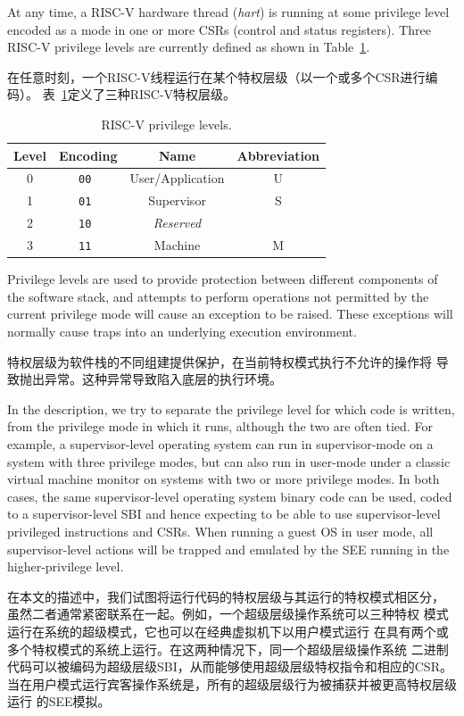 At any time, a RISC-V hardware thread ({\em hart}) is running at some
privilege level encoded as a mode in one or more CSRs (control and
status registers).  Three RISC-V privilege levels are currently defined
as shown in Table~\ref{privlevels}.

在任意时刻，一个RISC-V线程运行在某个特权层级（以一个或多个CSR进行编码）。
表~\ref{privlevels}定义了三种RISC-V特权层级。

\begin{table}[h!]
\begin{center}
\begin{tabular}{|c|c|c|c|}
  \hline
   Level & Encoding & Name      & Abbreviation \\ \hline  
   0     & \tt 00   & User/Application & U     \\ 
   1     & \tt 01   & Supervisor & S           \\ 
   2     & \tt 10   & {\em Reserved} &            \\ 
   3     & \tt 11   & Machine    & M           \\ 
  \hline
 \end{tabular}
\end{center}
\caption{RISC-V privilege levels.}
\label{privlevels}
\end{table}

Privilege levels are used to provide protection between different
components of the software stack, and attempts to perform operations
not permitted by the current privilege mode will cause an exception to
be raised.  These exceptions will normally cause traps into an
underlying execution environment.

特权层级为软件栈的不同组建提供保护，在当前特权模式执行不允许的操作将
导致抛出异常。这种异常导致陷入底层的执行环境。

\begin{commentary}
In the description, we try to separate the privilege level for which
code is written, from the privilege mode in which it runs, although
the two are often tied.  For example, a supervisor-level operating
system can run in supervisor-mode on a system with three privilege
modes, but can also run in user-mode under a classic virtual machine
monitor on systems with two or more privilege modes.  In both cases,
the same supervisor-level operating system binary code can be used,
coded to a supervisor-level SBI and hence expecting to be able to use
supervisor-level privileged instructions and CSRs.  When running a
guest OS in user mode, all supervisor-level actions will be trapped
and emulated by the SEE running in the higher-privilege level.

在本文的描述中，我们试图将运行代码的特权层级与其运行的特权模式相区分，
虽然二者通常紧密联系在一起。例如，一个超级层级操作系统可以三种特权
模式运行在系统的超级模式，它也可以在经典虚拟机下以用户模式运行
在具有两个或多个特权模式的系统上运行。在这两种情况下，同一个超级层级操作系统
二进制代码可以被编码为超级层级SBI，从而能够使用超级层级特权指令和相应的CSR。
当在用户模式运行宾客操作系统是，所有的超级层级行为被捕获并被更高特权层级运行
的SEE模拟。
\end{commentary}


